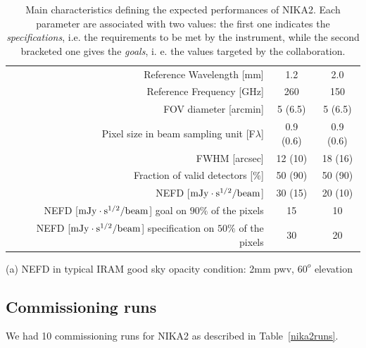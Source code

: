 \documentclass[a4paper, 11pt]{article} %
\begin{document}
\begin{table}[h]
\caption{Main characteristics defining the expected performances of NIKA2. Each parameter are associated with two values: the first one indicates the \emph{specifications}, i.e. the requirements to be met by the instrument, while the second bracketed one gives the \emph{goals}, i. e. the values targeted by the collaboration.}
\label{nika2specs}
\begin{threeparttable}
\begin{tabular}{|r|c|c|}
  \hline
  \hline
Reference Wavelength  [mm]  &  1.2 & 2.0  \\
Reference Frequency  [GHz]  &  260 & 150  \\
\hline  
\hline
FOV diameter [arcmin]       &  5 (6.5)    &  5 (6.5)   \\
Pixel size in beam sampling unit [F$\lambda$]  &  0.9 (0.6)   &   0.9 (0.6)  \\
FWHM  [arcsec]              &  12 (10)   &  18 (16) \\
Fraction of valid detectors [$\%$] &  50 (90)   &  50 (90) \\
NEFD\tnote{a}\hspace{1mm}   [$\rm{mJy} \cdot \rm{s}^{1/2}/\rm{beam}$]  &  30 (15)   &  20 (10) \\
\hline
NEFD [$\rm{mJy} \cdot \rm{s}^{1/2}/\rm{beam}$] goal on $90\%$ of the pixels  &  15  & 10 \\
NEFD [$\rm{mJy} \cdot \rm{s}^{1/2}/\rm{beam}$] specification on $50\%$ of the pixels  &  30  &  20  \\
\hline
\end{tabular}
\begin{tablenotes}
  \item[(a)] NEFD in typical IRAM good sky opacity condition: 2mm pwv, $60^o$ elevation
\end{tablenotes}
\end{threeparttable}
\end{table} 


\subsection{Commissioning runs}
We had 10 commissioning runs for NIKA2 as described in Table~\ref{nika2runs}.
\end{document}
